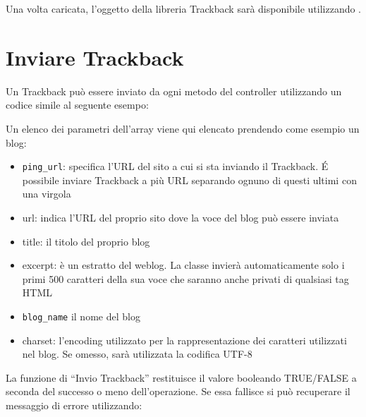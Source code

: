 Una volta caricata, l'oggetto della libreria Trackback sarà disponibile utilizzando .

\section*{Inviare Trackback}
Un Trackback può essere inviato da ogni metodo del controller utilizzando un codice simile al seguente esempo:


Un elenco dei parametri dell'array viene qui elencato prendendo come esempio un blog:

\begin{itemize}
\item \verb|ping_url|: specifica l'URL del sito a cui si sta inviando il Trackback. \'E possibile inviare Trackback a più URL separando ognuno di questi ultimi con una virgola
\item url: indica l'URL del proprio sito dove la voce del blog può essere inviata
\item title: il titolo del proprio blog
\item excerpt: è un estratto del weblog. La classe invierà automaticamente solo i primi 500 caratteri della sua voce che saranno anche privati di qualsiasi tag HTML
\item \verb|blog_name| il nome del blog
\item charset: l'encoding utilizzato per la rappresentazione dei caratteri utilizzati nel blog. Se omesso, sarà utilizzata la codifica UTF-8
\end{itemize}

La funzione di ``Invio Trackback'' restituisce il valore booleando TRUE/FALSE a seconda del successo o meno dell'operazione. Se essa fallisce si può recuperare il messaggio di errore utilizzando:

